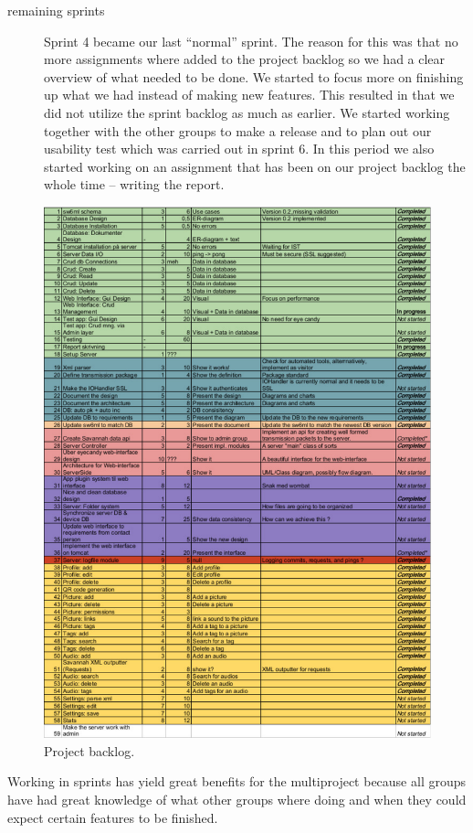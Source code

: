 \begin{description}
\item[remaining sprints]
	Sprint 4 became our last ``normal'' sprint. The reason for this was that no more assignments where added to the project backlog so we had a clear overview of what needed to be done. We started to focus more on finishing up what we had instead of making new features. This resulted in that we did not utilize the sprint backlog as much as earlier. We started working together with the other groups to make a release and to plan out our usability test which was carried out in sprint 6. In this period we also started working on an assignment that has been on our project backlog the whole time -- writing the report.  
\end{description}

\begin{figure}
 \includegraphics[scale=0.72]{images/projectBacklog}
 \caption{Project backlog.}
 \label{fig:projectBacklog}
\end{figure}

Working in sprints has yield great benefits for the multiproject because all groups have had great knowledge of what other groups where doing and when they could expect certain features to be finished. 